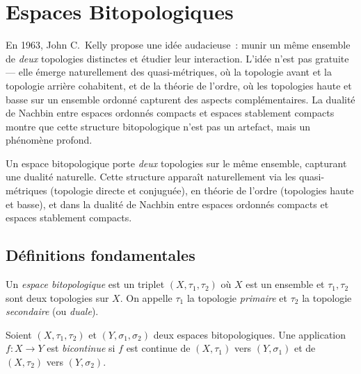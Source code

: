 \chapter{Espaces Bitopologiques}
\label{ch:bitopologiques}

En 1963, John C.\ Kelly propose une id\'ee audacieuse~: munir un m\^eme ensemble de \emph{deux} topologies distinctes et \'etudier leur interaction. L'id\'ee n'est pas gratuite --- elle \'emerge naturellement des quasi-m\'etriques, o\`u la topologie \og avant \fg et la topologie \og arri\`ere \fg cohabitent, et de la th\'eorie de l'ordre, o\`u les topologies haute et basse sur un ensemble ordonn\'e capturent des aspects compl\'ementaires. La dualit\'e de Nachbin entre espaces ordonn\'es compacts et espaces stablement compacts montre que cette structure bitopologique n'est pas un artefact, mais un ph\'enom\`ene profond.

\begin{intuition}
Un espace bitopologique porte \emph{deux} topologies sur le m\^eme ensemble, capturant
une dualit\'e naturelle. Cette structure appara\^it naturellement via les quasi-m\'etriques
(topologie directe et conjugu\'ee), en th\'eorie de l'ordre (topologies haute et basse),
et dans la dualit\'e de Nachbin entre espaces ordonn\'es compacts et espaces stablement
compacts.
\end{intuition}

\section{D\'efinitions fondamentales}

\begin{definition}
Un \emph{espace bitopologique} est un triplet $(X, \tau_1, \tau_2)$ o\`u $X$ est un
ensemble et $\tau_1, \tau_2$ sont deux topologies sur $X$. On appelle $\tau_1$ la topologie
\emph{primaire} et $\tau_2$ la topologie \emph{secondaire} (ou \emph{duale}).
\end{definition}

\begin{definition}
Soient $(X, \tau_1, \tau_2)$ et $(Y, \sigma_1, \sigma_2)$ deux espaces bitopologiques. Une
application $f\colon X \to Y$ est \emph{bicontinue} si $f$ est continue de $(X,\tau_1)$
vers $(Y,\sigma_1)$ et de $(X,\tau_2)$ vers $(Y,\sigma_2)$.
\end{definition}

